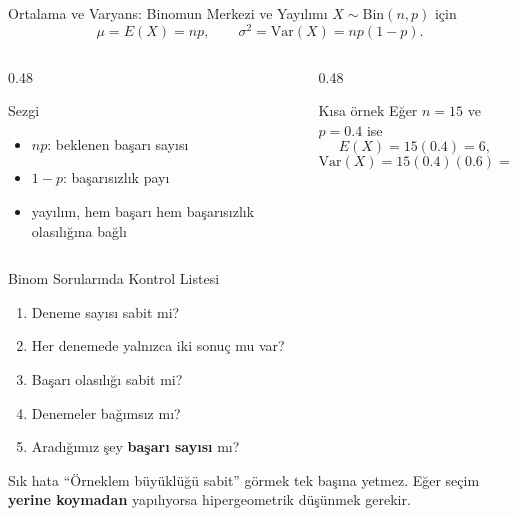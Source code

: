 \documentclass[light]{lutbeamer}
\begin{document}
\begin{frame}{Ortalama ve Varyans: Binomun Merkezi ve Yayılımı}
    \small
    \(X \sim \mathrm{Bin}(n,p)\) için
    \[
    \mu = E(X)=np, \qquad \sigma^2=\mathrm{Var}(X)=np(1-p).
    \]

    \begin{columns}[T]
        \begin{column}{0.48\textwidth}
            \begin{block}{Sezgi}
                \begin{itemize}
                    \item \(np\): beklenen başarı sayısı
                    \item \(1-p\): başarısızlık payı
                    \item yayılım, hem başarı hem başarısızlık olasılığına bağlı
                \end{itemize}
            \end{block}
        \end{column}
        \begin{column}{0.48\textwidth}
            \begin{exampleblock}{Kısa örnek}
                Eğer \(n=15\) ve \(p=0.4\) ise
                \[
                E(X)=15(0.4)=6,
                \]
                \[
                \mathrm{Var}(X)=15(0.4)(0.6)=3.6.
                \]
            \end{exampleblock}
        \end{column}
    \end{columns}
\end{frame}

\begin{frame}{Binom Sorularında Kontrol Listesi}
    \small
    \begin{enumerate}
        \item Deneme sayısı sabit mi?
        \item Her denemede yalnızca iki sonuç mu var?
        \item Başarı olasılığı sabit mi?
        \item Denemeler bağımsız mı?
        \item Aradığımız şey \textbf{başarı sayısı} mı?
    \end{enumerate}

    \begin{alertblock}{Sık hata}
        ``Örneklem büyüklüğü sabit'' görmek tek başına yetmez. Eğer seçim \textbf{yerine koymadan} yapılıyorsa hipergeometrik düşünmek gerekir.
    \end{alertblock}
\end{frame}
\end{document}
